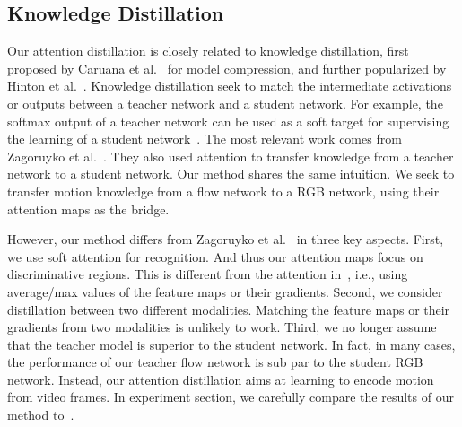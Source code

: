 \documentclass[10pt,twocolumn,letterpaper]{article}
\begin{document}

\subsection{Knowledge Distillation}
Our attention distillation is closely related to knowledge distillation, first proposed by Caruana et al.\ \cite{buciluǎ2006model} for model compression, and further popularized by Hinton et al.\ \cite{hinton2015distilling}. Knowledge distillation seek to match the intermediate activations or outputs between a teacher network and a student network. For example, the softmax output of a teacher network can be used as a soft target for supervising the learning of a student network~\cite{hinton2015distilling}. The most relevant work comes from Zagoruyko et al.\ \cite{Zagoruyko2017AT}. They also used attention to transfer knowledge from a teacher network to a student network. Our method shares the same intuition. We seek to transfer motion knowledge from a flow network to a RGB network, using their attention maps as the bridge. 

However, our method differs from Zagoruyko et al.\ \cite{Zagoruyko2017AT} in three key aspects. First, we use soft attention for recognition. And thus our attention maps focus on discriminative regions. This is different from the attention in~\cite{Zagoruyko2017AT}, i.e., using average/max values of the feature maps or their gradients. Second, we consider distillation between two different modalities. Matching the feature maps or their gradients from two modalities is unlikely to work. Third, we no longer assume that the teacher model is superior to the student network. In fact, in many cases, the performance of our teacher flow network is sub par to the student RGB network. Instead, our attention distillation aims at learning to encode motion from video frames. In experiment section, we carefully compare the results of our method to~\cite{Zagoruyko2017AT}.
\end{document}
